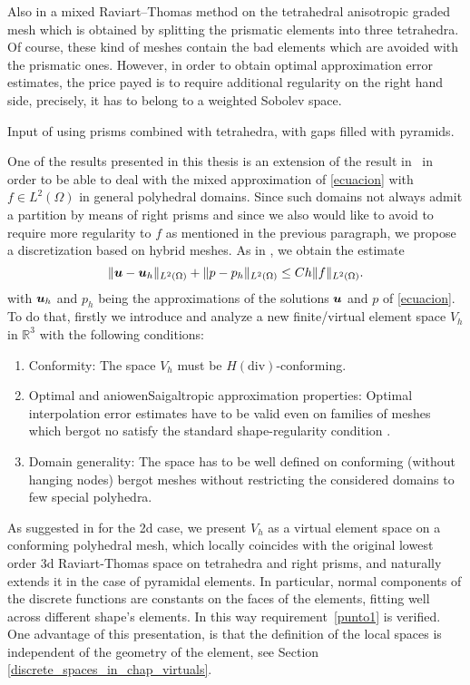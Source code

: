 Also in \cite{MR1866274} a mixed Raviart--Thomas method on the tetrahedral 
anisotropic graded mesh which is obtained by splitting the prismatic elements 
into three tetrahedra. Of course, these kind of meshes contain the bad elements 
which are avoided with the prismatic ones. However, in order to obtain optimal 
approximation error estimates, the price payed is to require additional regularity 
on the right hand side, precisely, it has to belong to a weighted Sobolev space.

Input of using prisms combined with tetrahedra, with gaps filled with pyramids.

One of the results presented in this thesis is an extension 
of the result in~\cite{MR1866274} in order to be able to deal with the
mixed approximation of \eqref{ecuacion} with $f\in L^2(\Omega)$ in general polyhedral domains. 
Since such domains not always admit a partition by means of right prisms and since 
we also would like to avoid to require more regularity to $f$ as mentioned in the previous paragraph, we propose a 
discretization based on hybrid meshes. As in \cite{MR1866274}, we obtain the estimate
\begin{equation}\label{jl2: aim}
 \|\boldsymbol{u}-\boldsymbol{u}_h\|_{L^2(\Omega)} + \|p-p_h\|_{L^2(\Omega)} \le Ch\|f\|_{L^2(\Omega)}.
\end{equation}
with $\boldsymbol{u}_h$ and $p_h$ being the approximations of the solutions $\boldsymbol{u}$ and $p$ of \eqref{ecuacion}. 
To do that, firstly we introduce and analyze a new finite/virtual element space $V_h$ in 
$\mathbb R^3$ with the following conditions:  
\begin{enumerate}
\item \label{punto1} Conformity: The space $V_h$ must be $H(\mbox{div})$-conforming.
\item \label{punto2} Optimal and aniowenSaigaltropic approximation properties: Optimal interpolation error estimates have to be valid even on families of meshes which bergot no satisfy the standard shape-regularity condition \cite{ciarlet}.
\item \label{punto3} Domain generality: The space has to be well defined on conforming (without hanging nodes) bergot meshes without restricting the considered domains to few special polyhedra. 
\end{enumerate}
As suggested in \cite{bfm} for the 2d case, we present $V_h$ as a virtual element space on a conforming 
polyhedral mesh, which 
locally coincides with the original lowest order 3d Raviart-Thomas space on
tetrahedra and right prisms, and naturally extends it in the case of pyramidal elements. 
In particular, normal components of the discrete functions are constants on the faces of the 
elements, fitting well across different shape's elements. In this way requirement~\ref{punto1} is verified. 
One advantage of this presentation, is that the definition of the local spaces is independent of the 
geometry of the element, see Section \ref{discrete_spaces_in_chap_virtuals}. 

